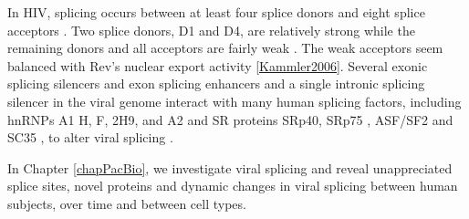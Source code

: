 \documentclass[../sherrill-Mix_thesis.tex]{subfiles}
\begin{document}
	 In HIV, splicing occurs between at least four splice donors and eight splice acceptors \citep{Stoltzfus2009}. Two splice donors, D1 and D4, are relatively strong while the remaining donors and all acceptors are fairly weak \citep{O'Reilly1995}. The weak acceptors seem balanced with Rev's nuclear export activity \ref{Kammler2006}. Several exonic splicing silencers \citep{Amendt1994,Levengood2012} and exon splicing enhancers \citep{Caputi2004,Asang2008} and a single intronic splicing silencer \citep{Tange2001} in the viral genome interact with many human splicing factors, including hnRNPs A1 \citep{Tange2001, Levengood2012} H, F, 2H9, and A2 \citep{Jablonski2008} and SR proteins SRp40\citep{Caputi2004,Tranell2010}, SRp75 \citep{Tranell2010}, ASF/SF2 \citep{Caputi2004} and SC35 \citep{Jablonski2008}, to alter viral splicing \citep{Stoltzfus2006,Stoltzfus2009}.

	 In Chapter \ref{chapPacBio}, we investigate viral splicing and reveal unappreciated splice sites, novel proteins and dynamic changes in viral splicing between human subjects, over time and between cell types.








\end{document}
